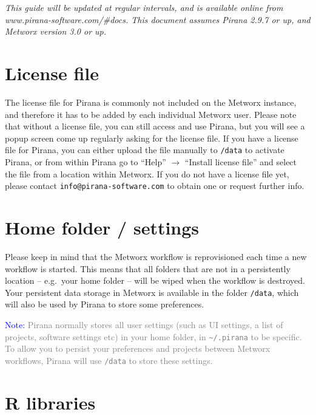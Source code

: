 \documentclass[a4,11pt]{report}
\begin{document}
\noindent\emph{This guide will be updated at regular intervals, and is
available online from www.pirana-software.com/\#docs. This document
assumes Pirana 2.9.7 or up, and Metworx version 3.0 or up.}

\section*{License file}\label{license-file}

The license file for Pirana is commonly not included on the Metworx
instance, and therefore it has to be added by each individual Metworx user.
Please note that without a license file, you can still access and use
Pirana, but you will see a popup screen come up regularly asking for the
license file. If you have a license file for Pirana, you can either
upload the file manually to \texttt{/data} to activate Pirana, or from
within Pirana go to ``Help'' $\rightarrow$ ``Install license file''
and select the file from a location within Metworx. If you do not have a
license file yet, please contact \texttt{info@pirana-software.com} to
obtain one or request further info.

\section*{Home folder / settings}\label{home-folder-settings}

Please keep in mind that the Metworx workflow is reprovisioned each time
a new workflow is started. This means that all folders that are not in a
persistently location -- e.g.~your home folder -- will be wiped when the
workflow is destroyed. Your persistent data storage in Metworx is
available in the folder \texttt{/data}, which will also be used by Pirana to
store some preferences.

\vspace{10pt}

\noindent\scriptsize{\textcolor{Blue}{Note:} \textcolor{Grey}{Pirana normally stores all user
settings (such as UI settings, a list of projects, software settings
etc) in your home folder, in \texttt{\textasciitilde{}/.pirana} to be
specific. To allow you to persist your preferences and
projects between Metworx workflows, Pirana will use \texttt{/data} to store these settings.}}\normalsize

\section*{R libraries}\label{r-libraries}
\end{document}
